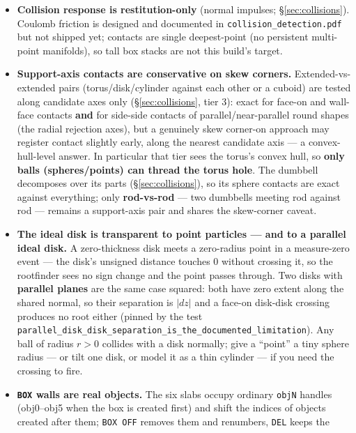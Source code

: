 \documentclass[11pt]{article}
\newcommand{\code}[1]{\texttt{#1}}
\begin{document}
\begin{itemize}
\item \textbf{Collision response is restitution-only} (normal
      impulses; \S\ref{sec:collisions}). Coulomb friction is designed
      and documented in \code{collision\_detection.pdf} but not
      shipped yet; contacts are single deepest-point (no persistent
      multi-point manifolds), so tall box stacks are not this build's
      target.
\item \textbf{Support-axis contacts are conservative on skew corners.}
      Extended-vs-extended pairs (torus/disk/cylinder against each
      other or a cuboid) are tested along candidate axes only
      (\S\ref{sec:collisions}, tier 3): exact for face-on and
      wall-face contacts \textbf{and} for side-side contacts of
      parallel/near-parallel round shapes (the radial rejection axes),
      but a genuinely skew corner-on approach may register contact
      slightly early, along the nearest candidate axis --- a
      convex-hull-level answer. In particular that tier sees the
      torus's convex hull, so \textbf{only balls (spheres/points) can
      thread the torus hole}. The dumbbell decomposes over its parts
      (\S\ref{sec:collisions}), so its sphere contacts are exact
      against everything; only \textbf{rod-vs-rod} --- two dumbbells
      meeting rod against rod --- remains a support-axis pair and
      shares the skew-corner caveat.
\item \textbf{The ideal disk is transparent to point particles --- and
      to a parallel ideal disk.} A zero-thickness disk meets a
      zero-radius point in a measure-zero event --- the disk's
      unsigned distance touches 0 without crossing it, so the
      rootfinder sees no sign change and the point passes through. Two
      disks with \textbf{parallel planes} are the same case squared:
      both have zero extent along the shared normal, so their
      separation is $|dz|$ and a face-on disk-disk crossing produces
      no root either (pinned by the test
      \code{parallel\_disk\_disk\_separation\_is\_the\_documented\_limitation}).
      Any ball of radius $r > 0$ collides with a disk normally; give a
      ``point'' a tiny sphere radius --- or tilt one disk, or model it
      as a thin cylinder --- if you need the crossing to fire.
\item \textbf{\code{BOX} walls are real objects.} The six slabs occupy
      ordinary \code{objN} handles (obj0--obj5 when the box is created
      first) and shift the indices of objects created after them;
      \code{BOX OFF} removes them and renumbers, \code{DEL} keeps the

\end{itemize}
\end{document}
